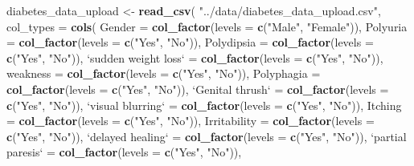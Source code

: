 \documentclass[
]{article}
\newenvironment{Shaded}{}{}
\newcommand{\DataTypeTok}[1]{\textcolor[rgb]{0.56,0.13,0.00}{#1}}
\newcommand{\KeywordTok}[1]{\textcolor[rgb]{0.00,0.44,0.13}{\textbf{#1}}}
\newcommand{\NormalTok}[1]{#1}
\newcommand{\StringTok}[1]{\textcolor[rgb]{0.25,0.44,0.63}{#1}}
\begin{document}
\begin{Shaded}
\begin{Highlighting}[]
\NormalTok{diabetes_data_upload <-}\StringTok{ }\KeywordTok{read_csv}\NormalTok{(}
  \StringTok{"../data/diabetes_data_upload.csv"}\NormalTok{,}
  \DataTypeTok{col_types =} \KeywordTok{cols}\NormalTok{(}
    \DataTypeTok{Gender =} \KeywordTok{col_factor}\NormalTok{(}\DataTypeTok{levels =} \KeywordTok{c}\NormalTok{(}\StringTok{"Male"}\NormalTok{, }\StringTok{"Female"}\NormalTok{)),}
    \DataTypeTok{Polyuria =} \KeywordTok{col_factor}\NormalTok{(}\DataTypeTok{levels =} \KeywordTok{c}\NormalTok{(}\StringTok{"Yes"}\NormalTok{, }\StringTok{"No"}\NormalTok{)),}
    \DataTypeTok{Polydipsia =} \KeywordTok{col_factor}\NormalTok{(}\DataTypeTok{levels =} \KeywordTok{c}\NormalTok{(}\StringTok{"Yes"}\NormalTok{, }\StringTok{"No"}\NormalTok{)),}
    \StringTok{`}\DataTypeTok{sudden weight loss}\StringTok{`}\NormalTok{ =}\StringTok{ }\KeywordTok{col_factor}\NormalTok{(}\DataTypeTok{levels =} \KeywordTok{c}\NormalTok{(}\StringTok{"Yes"}\NormalTok{, }\StringTok{"No"}\NormalTok{)),}
    \DataTypeTok{weakness =} \KeywordTok{col_factor}\NormalTok{(}\DataTypeTok{levels =} \KeywordTok{c}\NormalTok{(}\StringTok{"Yes"}\NormalTok{, }\StringTok{"No"}\NormalTok{)),}
    \DataTypeTok{Polyphagia =} \KeywordTok{col_factor}\NormalTok{(}\DataTypeTok{levels =} \KeywordTok{c}\NormalTok{(}\StringTok{"Yes"}\NormalTok{, }\StringTok{"No"}\NormalTok{)),}
    \StringTok{`}\DataTypeTok{Genital thrush}\StringTok{`}\NormalTok{ =}\StringTok{ }\KeywordTok{col_factor}\NormalTok{(}\DataTypeTok{levels =} \KeywordTok{c}\NormalTok{(}\StringTok{"Yes"}\NormalTok{, }\StringTok{"No"}\NormalTok{)),}
    \StringTok{`}\DataTypeTok{visual blurring}\StringTok{`}\NormalTok{ =}\StringTok{ }\KeywordTok{col_factor}\NormalTok{(}\DataTypeTok{levels =} \KeywordTok{c}\NormalTok{(}\StringTok{"Yes"}\NormalTok{, }\StringTok{"No"}\NormalTok{)),}
    \DataTypeTok{Itching =} \KeywordTok{col_factor}\NormalTok{(}\DataTypeTok{levels =} \KeywordTok{c}\NormalTok{(}\StringTok{"Yes"}\NormalTok{, }\StringTok{"No"}\NormalTok{)),}
    \DataTypeTok{Irritability =} \KeywordTok{col_factor}\NormalTok{(}\DataTypeTok{levels =} \KeywordTok{c}\NormalTok{(}\StringTok{"Yes"}\NormalTok{, }\StringTok{"No"}\NormalTok{)),}
    \StringTok{`}\DataTypeTok{delayed healing}\StringTok{`}\NormalTok{ =}\StringTok{ }\KeywordTok{col_factor}\NormalTok{(}\DataTypeTok{levels =} \KeywordTok{c}\NormalTok{(}\StringTok{"Yes"}\NormalTok{, }\StringTok{"No"}\NormalTok{)),}
    \StringTok{`}\DataTypeTok{partial paresis}\StringTok{`}\NormalTok{ =}\StringTok{ }\KeywordTok{col_factor}\NormalTok{(}\DataTypeTok{levels =} \KeywordTok{c}\NormalTok{(}\StringTok{"Yes"}\NormalTok{, }\StringTok{"No"}\NormalTok{)),}

\end{Highlighting}
\end{Shaded}
\end{document}
